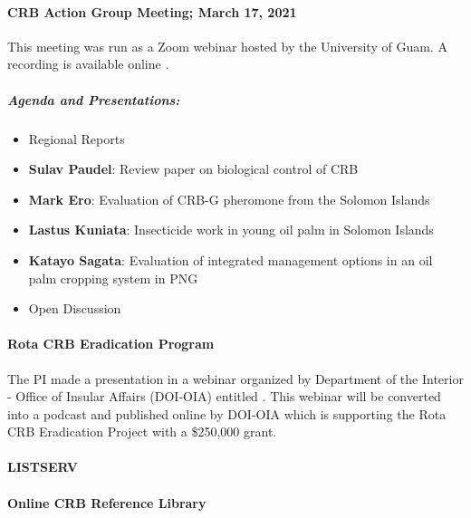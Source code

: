 \documentclass[12pt,letterpaper,english,bibliography=totocnumbered,abstract=on]{scrartcl}
\begin{document}
\paragraph{CRB Action Group Meeting; March 17, 2021}
This meeting was run as a Zoom webinar hosted by the University of Guam. A recording is available online \cite{mooreVideoRecordingCRBG2020}.

\subparagraph{Agenda and Presentations:}
\begin{itemize}
	\item Regional Reports
	\item \textbf{Sulav Paudel}: Review paper on biological control of CRB
	\item \textbf{Mark Ero}: Evaluation of CRB-G pheromone from the Solomon Islands
	\item \textbf{Lastus Kuniata}: Insecticide work in young oil palm in Solomon Islands
	\item \textbf{Katayo Sagata}: Evaluation of integrated management options in an oil palm cropping system in PNG
	\item Open Discussion	
\end{itemize}


\paragraph{Rota CRB Eradication Program}
The PI made a presentation in a webinar organized by Department of the Interior - Office of Insular Affairs (DOI-OIA) entitled \cite{mooreCRBBiologyKnow2021}. This webinar will be converted into a podcast and published online by DOI-OIA which is supporting the Rota CRB Eradication Project with a \$250,000 grant.

\paragraph{LISTSERV}

\paragraph{Online CRB Reference Library}
\end{document}
